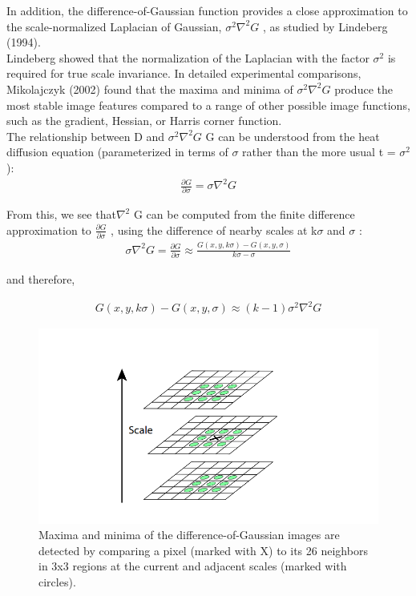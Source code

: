 In addition, the difference-of-Gaussian function provides a close approximation to the
scale-normalized Laplacian of Gaussian, $\sigma^2\nabla^2 G $
, as studied by Lindeberg (1994).\\Lindeberg
showed that the normalization of the Laplacian with the factor $\sigma^2$
is required for true scale invariance. In detailed experimental comparisons, Mikolajczyk (2002) found that the maxima and minima of $\sigma^2\nabla^2 G $  produce the most stable image features compared to a range
of other possible image functions, such as the gradient, Hessian, or Harris corner function.\\
The relationship between D and $\sigma^2\nabla^2G $
G can be understood from the heat diffusion
equation (parameterized in terms of $\sigma$ rather than the more usual t = $\sigma^2$):\\

\begin{align}
    \frac {\partial G} {\partial \sigma} = \sigma \nabla^2 G 
\end{align}




From this, we see that$\nabla^2$ G can be computed from the finite difference approximation to  $\frac{\partial G}{\partial \sigma }$ , using the difference of nearby scales at k$\sigma$ and $\sigma$ :\\


\begin{align}
      \sigma \nabla^2 G =   \frac {\partial G} {\partial \sigma} \approx   \frac {G(x,y,k \sigma) -  G(x,y,\sigma)}{ k \sigma - \sigma}  
\end{align}


and therefore,


\begin{align}
      G(x,y,k \sigma) -  G(x,y,\sigma)  \approx (k - 1)  \sigma^2\nabla^2G 
\end{align}

\begin{figure}[H]
\centering
\includegraphics[width=1.0\textwidth]{img/sift2.PNG}
\caption{ Maxima and minima of the difference-of-Gaussian images are detected by comparing a
pixel (marked with X) to its 26 neighbors in 3x3 regions at the current and adjacent scales (marked
with circles).}
\label{fig:sift2}
\end{figure}

